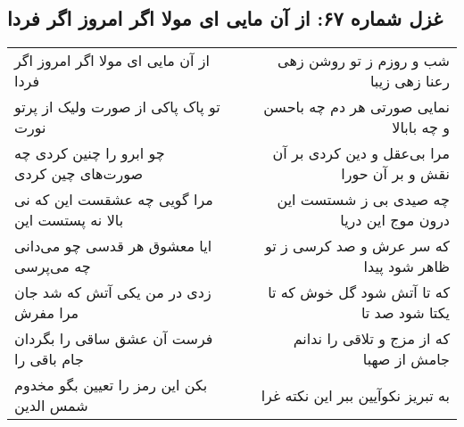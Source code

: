 \begin{center}
\section*{غزل شماره ۶۷: از آن مایی ای مولا اگر امروز اگر فردا}
\label{sec:0067}
\begin{longtable}{l p{0.5cm} r}
از آن مایی ای مولا اگر امروز اگر فردا
&&
شب و روزم ز تو روشن زهی رعنا زهی زیبا
\\
تو پاک پاکی از صورت ولیک از پرتو نورت
&&
نمایی صورتی هر دم چه باحسن و چه بابالا
\\
چو ابرو را چنین کردی چه صورت‌های چین کردی
&&
مرا بی‌عقل و دین کردی بر آن نقش و بر آن حورا
\\
مرا گویی چه عشقست این که نی بالا نه پستست این
&&
چه صیدی بی ز شستست این درون موج این دریا
\\
ایا معشوق هر قدسی چو می‌دانی چه می‌پرسی
&&
که سر عرش و صد کرسی ز تو ظاهر شود پیدا
\\
زدی در من یکی آتش که شد جان مرا مفرش
&&
که تا آتش شود گل خوش که تا یکتا شود صد تا
\\
فرست آن عشق ساقی را بگردان جام باقی را
&&
که از مزج و تلاقی را ندانم جامش از صهبا
\\
بکن این رمز را تعیین بگو مخدوم شمس الدین
&&
به تبریز نکوآیین ببر این نکته غرا
\\
\end{longtable}
\end{center}
